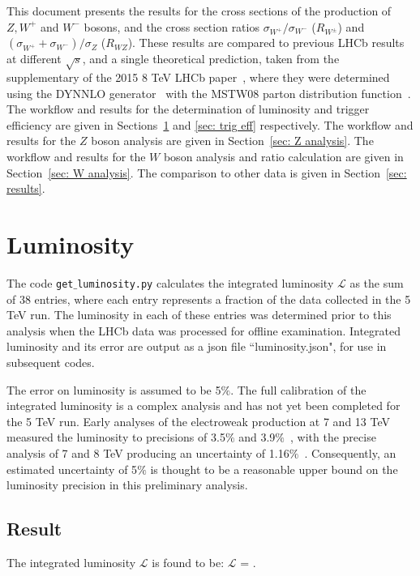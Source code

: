 \documentclass[a4paper,12pt]{article}
\begin{document}
This document presents the results for the cross sections of the production of $Z, W^+$ and $W^-$ bosons, and the cross section ratios $\sigma_{W^+}/\sigma_{W^-}$ ($R_{W^\pm}$) and $(\sigma_{W^+}+\sigma_{W^-})/\sigma_{Z}$ ($R_{WZ}$). These results are compared to previous LHCb results at different $\sqrt{s}$, and a single theoretical prediction, taken from the supplementary of the 2015 8 TeV LHCb paper~\cite{8TeV_W+Z_2015}, where they were determined using the DYNNLO generator~\cite{DYNNLO} with the MSTW08 parton distribution function~\cite{MSTW08}.
The workflow and results for the determination of luminosity and trigger efficiency are given in Sections~\ref{sec: lumi} and \ref{sec: trig eff} respectively. The workflow and results for the $Z$ boson analysis are given in Section~\ref{sec: Z analysis}. The workflow and results for the $W$ boson analysis and ratio calculation are given in Section~\ref{sec: W analysis}. The comparison to other data is given in Section~\ref{sec: results}.


\section{Luminosity} \label{sec: lumi}
The code \texttt{get$\_$luminosity.py} calculates the integrated luminosity $\mathcal{L}$ as the sum of 38 entries, where each entry represents a fraction of the data collected in the 5 TeV run. 
The luminosity in each of these entries was determined prior to this analysis when the LHCb data was processed for offline examination. 
Integrated luminosity and its error are output as a json file ``luminosity.json", for use in subsequent codes.


The error on luminosity is assumed to be 5$\%$.
The full calibration of the integrated luminosity is a complex analysis and has not yet been completed for the 5 TeV run.
Early analyses of the electroweak production at 7 and 13 TeV measured the luminosity to precisions of 3.5$\%$ and 3.9$\%$~\cite{7TeV_W+Z_2012,13TeV_Z_2016}, with the precise analysis of 7 and 8 TeV producing an uncertainty of 1.16$\%$~\cite{LHCb_luminosity}.
Consequently, an estimated uncertainty of 5$\%$ is thought to be a reasonable upper bound on the luminosity precision in this preliminary analysis.

\subsection{Result}
The integrated luminosity $\mathcal{L}$ is found to be:
$\mathcal{L}$ = .
\end{document}
